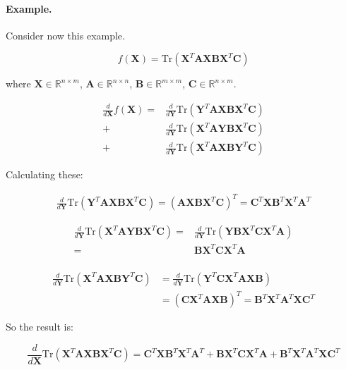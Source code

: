 \documentclass{article}
\begin{document}
\paragraph{Example.} Consider now this example.

\[
f(\mathbf{X}) = \text{Tr}(\mathbf{X}^T \mathbf{A} \mathbf{X} \mathbf{B} \mathbf{X}^T \mathbf{C})
\]

where $\mathbf{X} \in \mathbb{R}^{n\times m}$, $\mathbf{A} \in \mathbb{R}^{n\times n}$, $\mathbf{B} \in \mathbb{R}^{m\times m}$, $\mathbf{C} \in \mathbb{R}^{n\times m}$.

\[
\begin{split}
    \frac{d}{d\mathbf{X}} f(\mathbf{X}) =& \frac{d}{d\mathbf{Y}} \text{Tr}(\mathbf{Y}^T \mathbf{A} \mathbf{X} \mathbf{B} \mathbf{X}^T \mathbf{C})\\
    +& \frac{d}{d\mathbf{Y}} \text{Tr}(\mathbf{X}^T \mathbf{A} \mathbf{Y} \mathbf{B} \mathbf{X}^T \mathbf{C})\\
    +& \frac{d}{d\mathbf{Y}} \text{Tr}(\mathbf{X}^T \mathbf{A} \mathbf{X} \mathbf{B} \mathbf{Y}^T \mathbf{C})
\end{split}
\]

Calculating these:

\[
\begin{split}
    \frac{d}{d\mathbf{Y}} \text{Tr}(\mathbf{Y}^T \mathbf{A} \mathbf{X} \mathbf{B} \mathbf{X}^T \mathbf{C}) = (\mathbf{A} \mathbf{X} \mathbf{B} \mathbf{X}^T \mathbf{C})^T = \mathbf{C}^T \mathbf{X} \mathbf{B}^T \mathbf{X}^T \mathbf{A}^T
\end{split}
\]

\[
\begin{split}
    \frac{d}{d\mathbf{Y}} \text{Tr}(\mathbf{X}^T \mathbf{A} \mathbf{Y} \mathbf{B} \mathbf{X}^T \mathbf{C}) =& \frac{d}{d\mathbf{Y}} \text{Tr}(\mathbf{Y} \mathbf{B} \mathbf{X}^T \mathbf{C} \mathbf{X}^T \mathbf{A})\\
    =& \mathbf{B} \mathbf{X}^T \mathbf{C} \mathbf{X}^T \mathbf{A}\\
\end{split}
\]

\[
\begin{split}
   \frac{d}{d\mathbf{Y}} \text{Tr}(\mathbf{X}^T \mathbf{A} \mathbf{X} \mathbf{B} \mathbf{Y}^T \mathbf{C}) &= \frac{d}{d\mathbf{Y}} \text{Tr}(\mathbf{Y}^T \mathbf{C} \mathbf{X}^T \mathbf{A} \mathbf{X} \mathbf{B})\\
   &= (\mathbf{C} \mathbf{X}^T \mathbf{A} \mathbf{X} \mathbf{B})^T = \mathbf{B}^T \mathbf{X}^T \mathbf{A}^T \mathbf{X} \mathbf{C}^T
\end{split}
\]

So the result is:

\[
\frac{d}{d\mathbf{X}} \text{Tr}(\mathbf{X}^T \mathbf{A} \mathbf{X} \mathbf{B} \mathbf{X}^T \mathbf{C}) = \mathbf{C}^T \mathbf{X} \mathbf{B}^T \mathbf{X}^T \mathbf{A}^T + \mathbf{B} \mathbf{X}^T \mathbf{C} \mathbf{X}^T \mathbf{A} + \mathbf{B}^T \mathbf{X}^T \mathbf{A}^T \mathbf{X} \mathbf{C}^T
\]
\end{document}
